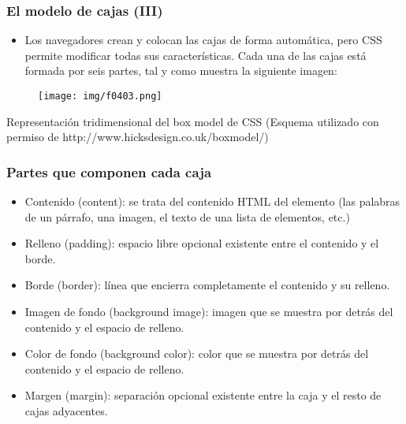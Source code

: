 \begin{frame}
\frametitle{El modelo de cajas (III)}

\begin{itemize}
  \item Los navegadores crean y colocan las cajas de forma automática, pero CSS permite modificar todas sus características. Cada una de las cajas está formada por seis partes, tal y como muestra la siguiente imagen:
\end{itemize}


\begin{center}
\begin{figure}[p]
\texttt{[image: img/f0403.png]}
\end{figure}
\end{center}
{\footnotesize
 Representación tridimensional del box model de CSS
(Esquema utilizado con permiso de http://www.hicksdesign.co.uk/boxmodel/)
}
\end{frame}


\begin{frame}
\frametitle{Partes que componen cada caja}

\begin{itemize}
  \item Contenido (content): se trata del contenido HTML del elemento (las palabras de un párrafo, una imagen, el texto de una lista de elementos, etc.)
  \item Relleno (padding): espacio libre opcional existente entre el contenido y el borde.
  \item Borde (border): línea que encierra completamente el contenido y su relleno.
  \item Imagen de fondo (background image): imagen que se muestra por detrás del contenido y el espacio de relleno.
  \item Color de fondo (background color): color que se muestra por detrás del contenido y el espacio de relleno.
  \item Margen (margin): separación opcional existente entre la caja y el resto de cajas adyacentes.
\end{itemize}

\end{frame}


